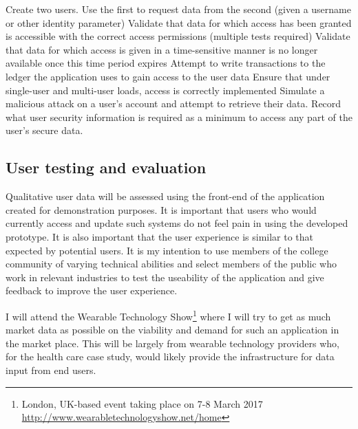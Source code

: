\begin{outline}
  \1 Create two users. Use the first to request data from the second (given a username or other identity parameter)
  \1 Validate that data for which access has been granted is accessible with the correct access permissions (multiple tests required)
  \1 Validate that data for which access is given in a time-sensitive manner is no longer available once this time period expires
  \1 Attempt to write transactions to the ledger the application uses to gain access to the user data
  \1 Ensure that under single-user and multi-user loads, access is correctly implemented
  \1 Simulate a malicious attack on a user's account and attempt to retrieve their data. Record what user security information is required as a minimum to access any part of the user's secure data.
\end{outline}

\subsection{User testing and evaluation}

Qualitative user data will be assessed using the front-end of the application created for demonstration purposes. It is important that users who would currently access and update such systems do not feel pain in using the developed prototype. It is also important that the user experience is similar to that expected by potential users. It is my intention to use members of the college community of varying technical abilities and select members of the public who work in relevant industries to test the useability of the application and give feedback to improve the user experience.

I will attend the Wearable Technology Show\footnote{London, UK-based event taking place on 7-8 March 2017 \url{http://www.wearabletechnologyshow.net/home}} where I will try to get as much market data as possible on the viability and demand for such an application in the market place. This will be largely from wearable technology providers who, for the health care case study, would likely provide the infrastructure for data input from end users.



